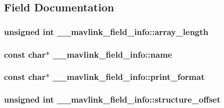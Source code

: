 \subsection{Field Documentation}
\hypertarget{struct____mavlink__field__info_aa3ab268c4176743874c8d05694ed293f}{
\subsubsection[{array\+\_\+length}]{\setlength{\rightskip}{0pt plus 5cm}unsigned int \+\_\+\+\_\+mavlink\+\_\+field\+\_\+info\+::array\+\_\+length}}\label{struct____mavlink__field__info_aa3ab268c4176743874c8d05694ed293f}
\hypertarget{struct____mavlink__field__info_a09193c7acc510180ecf6f944381e53c2}{
\subsubsection[{name}]{\setlength{\rightskip}{0pt plus 5cm}const char$\ast$ \+\_\+\+\_\+mavlink\+\_\+field\+\_\+info\+::name}}\label{struct____mavlink__field__info_a09193c7acc510180ecf6f944381e53c2}
\hypertarget{struct____mavlink__field__info_af3fc635b6e03851bb683c0c3d57dfc12}{
\subsubsection[{print\+\_\+format}]{\setlength{\rightskip}{0pt plus 5cm}const char$\ast$ \+\_\+\+\_\+mavlink\+\_\+field\+\_\+info\+::print\+\_\+format}}\label{struct____mavlink__field__info_af3fc635b6e03851bb683c0c3d57dfc12}
\hypertarget{struct____mavlink__field__info_acb947cd22e51e70e8b5f677b543196ac}{
\subsubsection[{structure\+\_\+offset}]{\setlength{\rightskip}{0pt plus 5cm}unsigned int \+\_\+\+\_\+mavlink\+\_\+field\+\_\+info\+::structure\+\_\+offset}}\label{struct____mavlink__field__info_acb947cd22e51e70e8b5f677b543196ac}
